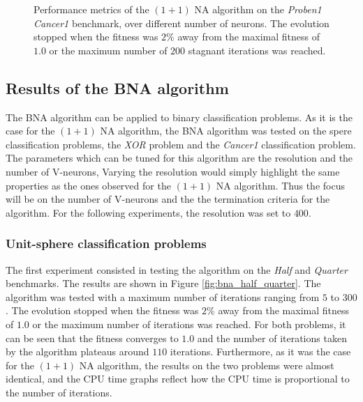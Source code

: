 \begin{figure}
\begin{center}
    \end{center}
    \caption{Performance metrics of the $(1 + 1)$ NA algorithm on the \textit{Proben1 Cancer1} benchmark, over different number of neurons.
    The evolution stopped when the fitness was $2\%$ away from the maximal fitness of $1.0$ or the maximum number of $200$ stagnant iterations was reached.}
    \label{fig:na_proben1}
\end{figure}

\subsection{Results of the BNA algorithm}

The BNA algorithm can be applied to binary classification problems. As it is the case for the $(1 + 1)$ NA algorithm, the BNA algorithm was tested on the spere classification problems,
the \textit{XOR} problem and the \textit{Cancer1} classification problem. The parameters which can be tuned for this algorithm are the resolution and the number of V-neurons,
Varying the resolution would simply highlight the same properties as the ones observed for the $(1 + 1)$ NA algorithm. Thus the focus will be on the number of V-neurons and the the termination
criteria for the algorithm. For the following experiments, the resolution was set to $400$.

\subsubsection{Unit-sphere classification problems}

The first experiment consisted in testing the algorithm on the \textit{Half} and \textit{Quarter} benchmarks. The results are shown in Figure \ref{fig:bna_half_quarter}. The algorithm
was tested with a maximum number of iterations ranging from $5$ to $300$. The evolution stopped when the fitness was $2\%$ away from the maximal fitness of $1.0$ or the maximum number
of iterations was reached. For both problems, it can be seen that the fitness converges to $1.0$ and the number of iterations taken by the algorithm plateaus around $110$ iterations. Furthermore,
as it was the case for the $(1 + 1)$ NA algorithm, the results on the two problems were almost identical, and the CPU time graphs reflect how the CPU time is proportional to the number of iterations.


